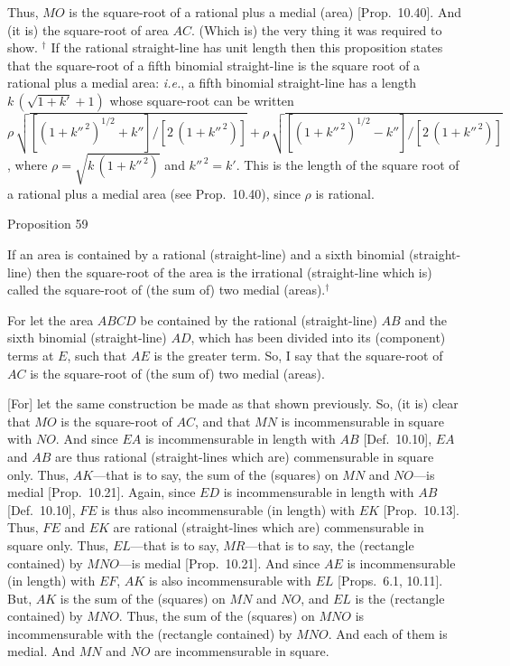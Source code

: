 Thus, $MO$ is the square-root of a rational plus a medial (area) [Prop.~10.40]. And (it is) the square-root
of area $AC$. (Which is) the very thing it was required to show.
{\footnotesize\noindent $^\dag$
If the rational straight-line has unit length then this proposition states that the square-root of 
a fifth binomial straight-line is the square root of a rational plus a medial area: {\em i.e.}, 
a fifth binomial straight-line has a length $k\,(\sqrt{1+k'}+1)$ whose
square-root can be written\\ $\rho\,\sqrt{[(1+k''^{\,2})^{1/2}+k'']/[2\,(1+k''^{\,2})]}+\rho\,\sqrt{[(1+k''^{\,2})^{1/2}-k'']/[2\,(1+k''^{\,2})]}$, where $\rho=\sqrt{k\,(1+k''^{\,2})}$ and $k''^{\,2}=k'$. This is the length of the square root of a rational plus a medial area (see Prop.~10.40), since $\rho$ is rational.}


\begin{center}
{\large Proposition 59}
\end{center}

If an area is contained by a rational (straight-line)
and a sixth binomial (straight-line) then the square-root of the
area is the irrational (straight-line which is)  called the square-root
of (the sum of) two medial (areas).$^\dag$

\epsfysize=1.35in
\centerline{}

For let the area $ABCD$ be contained by the rational (straight-line)
$AB$ and the sixth binomial (straight-line) $AD$, which has been
divided into its (component) terms at $E$, such that $AE$ is the greater
term. So, I say that the square-root of $AC$ is the square-root
of (the sum of) two medial (areas).

\mbox{[}For] let the same construction  be made as that shown previously. So, (it is)
clear that $MO$ is the square-root of $AC$, and that $MN$ is incommensurable
in square with $NO$. And since $EA$ is incommensurable
in length with $AB$ [Def.~10.10], $EA$ and $AB$ are thus rational (straight-lines
which are) commensurable in square only. Thus, $AK$---that is to
say, the sum of the (squares) on $MN$ and $NO$---is medial [Prop.~10.21]. Again, since  $ED$ is incommensurable in length with $AB$  [Def.~10.10], $FE$ is thus also incommensurable 
(in length) with $EK$ [Prop.~10.13]. 
Thus, $FE$ and $EK$ are rational (straight-lines which are) commensurable
in square only. Thus, $EL$---that is to say,  $MR$---that is to say,
the (rectangle contained) by $MNO$---is medial [Prop.~10.21]. And since $AE$ is incommensurable
(in length) with $EF$, $AK$ is also incommensurable with $EL$
[Props.~6.1, 10.11]. 
But, $AK$ is the sum of the (squares) on $MN$ and $NO$, and $EL$
is the (rectangle contained) by $MNO$. Thus,
the sum of the (squares) on $MNO$ is incommensurable with the (rectangle
contained) by $MNO$. And each of them is medial.  And $MN$ and
$NO$ are incommensurable in square.

